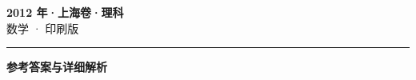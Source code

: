 \documentclass[zihao=5, a4paper]{ctexart}
\begin{document}
\begin{center}
  {\Large\bfseries 2012 年·上海卷·理科}\\[4pt]
  {\large 数学 · 印刷版}
\end{center}
\medskip
{}

\par\bigskip\hrule\bigskip
{}
\begin{center}{\large\bfseries 参考答案与详细解析}\end{center}
\smallskip

\end{document}
